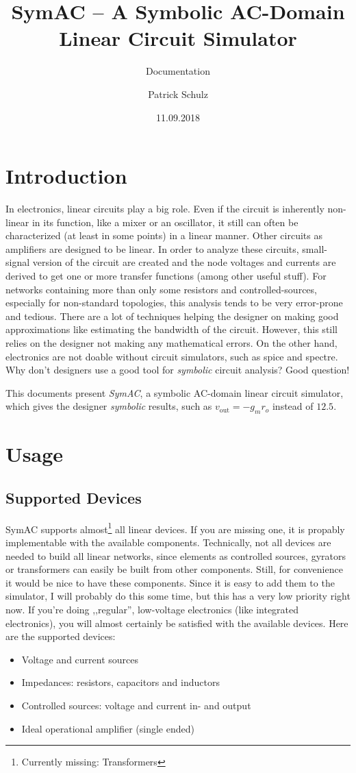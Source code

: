 \documentclass[titlepage]{scrartlc}
\title{SymAC -- A Symbolic AC-Domain Linear Circuit Simulator}
\subtitle{Documentation}
\author{Patrick Schulz}
\date{11.09.2018}
\begin{document}
    \maketitle
    \section{Introduction}
    In electronics, linear circuits play a big role. Even if the circuit is inherently non-linear in its function, like a mixer or an oscillator, it still can often be characterized (at least in some
    points) in a linear manner. Other circuits as amplifiers are designed to be linear. In order to analyze these circuits, small-signal version of the circuit are created and the node voltages and 
    currents are derived to get one or more transfer functions (among other useful stuff). For networks containing more than only some resistors and controlled-sources, especially for non-standard
    topologies, this analysis tends to be very error-prone and tedious. There are a lot of techniques helping the designer on making good approximations like estimating the bandwidth of the circuit.
    However, this still relies on the designer not making any mathematical errors. On the other hand, electronics are not doable without circuit simulators, such as spice and spectre. Why don't 
    designers use a good tool for \emph{symbolic} circuit analysis? Good question!

    This documents present \emph{SymAC}, a symbolic AC-domain linear circuit simulator, which gives the designer \emph{symbolic} results, such as $v_\mathrm{out} = -g_m r_o$ instead of $12.5$.
    \section{Usage}
        \subsection{Supported Devices}
        SymAC supports almost\footnote{Currently missing: Transformers} all linear devices. If you are missing one, it is propably implementable with the available components. Technically, not all
        devices are needed to build all linear networks, since elements as controlled sources, gyrators or transformers can easily be built from other components. Still, for convenience it would
        be nice to have these components. Since it is easy to add them to the simulator, I will probably do this some time, but this has a very low priority right now. If you're doing ,,regular'',
        low-voltage electronics (like integrated electronics), you will almost certainly be satisfied with the available devices. Here are the supported devices:
        \begin{itemize}
            \item Voltage and current sources
            \item Impedances: resistors, capacitors and inductors
            \item Controlled sources: voltage and current in- and output
            \item Ideal operational amplifier (single ended)
        \end{itemize}
\end{document}
